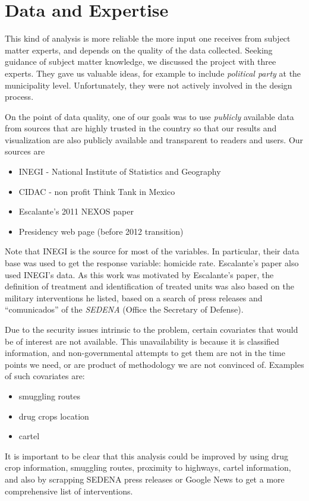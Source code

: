 \documentclass{article}[11 pt]
\begin{document}
\section{Data and Expertise}
This kind of analysis is more reliable the more input one receives from subject matter experts, and depends on the quality of the data collected. Seeking guidance of subject matter knowledge, we discussed the project with three experts. %
They gave us valuable ideas, for example to include \emph{political party} at the municipality level. Unfortunately, they were not actively involved in the design process.

On the point of data quality, one of our goals was to use \emph{publicly} available data from sources that are highly trusted in the country so that our results and visualization are also publicly available and transparent to readers and users.
Our sources are
		\begin{itemize}
			\item INEGI - National Institute of Statistics and Geography
			\item CIDAC -  non profit Think Tank in Mexico
			\item Escalante's 2011 NEXOS paper 
			\item Presidency web page (before 2012 transition)
		\end{itemize}
		Note that INEGI is the source for most of the variables. In particular, their data base was used to get the response variable: homicide rate. Escalante's paper also used INEGI's data. As this work was motivated by Escalante's paper, the definition of treatment and identification of treated units was also based on the military interventions he listed, based on a search of press releases and ``comunicados'' of the \emph{SEDENA} (Office the Secretary of Defense).
		
Due to the security issues intrinsic to the problem, certain covariates that would be of interest are not available. This unavailability is because it is classified information, and non-governmental attempts to get them are not in the time points we need, or are product of methodology we are not convinced of. Examples of such covariates are:
	\begin{itemize}
		\item smuggling routes
		\item drug crops location
		\item cartel
	\end{itemize}
	It is important to be clear that this analysis could be improved by using drug crop information, smuggling routes, proximity to highways, cartel information, and also by scrapping SEDENA press releases or Google News to get a more comprehensive list of interventions.
\end{document}
